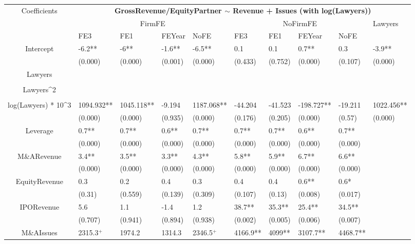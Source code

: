 \documentclass{article}
\begin{document}
\begin{table}[H]
\centering
\begin{tabular}{|clllllllll|}
\hline
\multirow{3}{*}{Coefficients} & \multicolumn{9}{c|}{\textbf{GrossRevenue/EquityPartner $\sim$ Revenue + Issues (with log(Lawyers))}} \\
\cline{2-10}
& \multicolumn{4}{c}{FirmFE} & \multicolumn{4}{c}{NoFirmFE} & \multirow{2}{*}{Lawyers} \\
\cline{2-9}
& FE3 & FE1 & FEYear & NoFE & FE3 & FE1 & FEYear & NoFE &  \\
\hline
 
Intercept & -6.2** & -6** & -1.6** & -6.5** & 0.1 & 0.1 & 0.7** & 0.3 & -3.9** \\ 
   & (0.000) & (0.000) & (0.001) & (0.000) & (0.433) & (0.752) & (0.000) & (0.107) & (0.000) \\ 
  Lawyers &  &  &  &  &  &  &  &  &  \\ 
   &  &  &  &  &  &  &  &  &  \\ 
  Lawyers^2 &  &  &  &  &  &  &  &  &  \\ 
   &  &  &  &  &  &  &  &  &  \\ 
  log(Lawyers) * 10^3 & 1094.932** & 1045.118** & -9.194 & 1187.068** & -44.204 & -41.523 & -198.727** & -19.211 & 1022.456** \\ 
   & (0.000) & (0.000) & (0.935) & (0.000) & (0.176) & (0.205) & (0.000) & (0.57) & (0.000) \\ 
  Leverage & 0.7** & 0.7** & 0.6** & 0.7** & 0.7** & 0.7** & 0.6** & 0.7** &  \\ 
   & (0.000) & (0.000) & (0.000) & (0.000) & (0.000) & (0.000) & (0.000) & (0.000) &  \\ 
  M\&ARevenue & 3.4** & 3.5** & 3.3** & 4.3** & 5.8** & 5.9** & 6.7** & 6.6** &  \\ 
   & (0.000) & (0.000) & (0.000) & (0.000) & (0.000) & (0.000) & (0.000) & (0.000) &  \\ 
  EquityRevenue & 0.3 & 0.2 & 0.4 & 0.3 & 0.4 & 0.4 & 0.6** & 0.6* &  \\ 
   & (0.31) & (0.559) & (0.139) & (0.309) & (0.107) & (0.13) & (0.008) & (0.017) &  \\ 
  IPORevenue & 5.6 & 1.1 & -1.4 & 1.2 & 38.7** & 35.3** & 25.4** & 34.5** &  \\ 
   & (0.707) & (0.941) & (0.894) & (0.938) & (0.002) & (0.005) & (0.006) & (0.007) &  \\ 
  M\&AIssues & 2315.3$^{+}$ & 1974.2 & 1314.3 & 2346.5$^{+}$ & 4166.9** & 4099** & 3107.7** & 4468.7** &  \\ 

\end{tabular}
\end{table}
\end{document}
